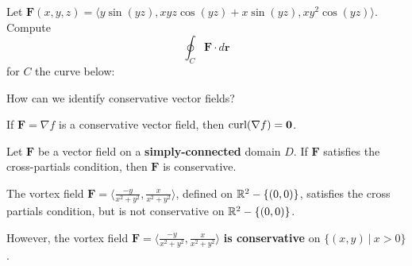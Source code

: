 \begin{example}
    Let $\bm{F}(x,y,z) = \langle y\sin(yz), xyz\cos(yz) + x\sin(yz), xy^2\cos(yz) \rangle$.  Compute $$\oint_C \bm{F} \cdot d\bm{r}$$ for $C$ the curve below:
    
\end{example}

\begin{motivating}
    How can we identify conservative vector fields?
\end{motivating}

\begin{theorem}
    If $\bm{F} = \nabla f$ is a conservative vector field, then $\textnormal{curl} (\nabla f) = \bm{0}$.
\end{theorem}



\begin{theorem}
    Let $\bm{F}$ be a vector field on a \textbf{simply-connected} domain $D$. If $\bm{F}$ satisfies the cross-partials condition, then $\bm{F}$ is conservative.
    \end{theorem}

\begin{example}
     The vortex field $\bm{F} = \langle \frac{-y}{x^2 + y^2}, \frac{x}{x^2 + y^2} \rangle$, defined on $\mathbb{R}^2 - \{(0,0)\}$, satisfies the cross partials condition, but is not conservative on $\mathbb{R}^2 - \{(0,0)\}$.

     \begin{center}
    \end{center}
\end{example}

\begin{example}
    However, the vortex field $\bm{F} = \langle \frac{-y}{x^2 + y^2}, \frac{x}{x^2 + y^2} \rangle$ \textbf{is conservative} on $\{(x,y) \ | \ x > 0\}$.
\end{example}


